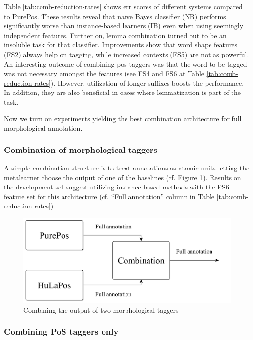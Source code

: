Table \ref{tab:comb-reduction-rates} shows \acrlong{err} scores of different systems compared to PurePos. 
These results reveal that naïve Bayes classifier (NB) performs significantly worse than instance-based learners (IB) even when using seemingly independent features.
Further on, lemma combination turned out to be an insoluble task for that classifier.
Improvements show that word shape features (FS2) always help on tagging, while increased contexts (FS5) are not as powerful.
An interesting outcome of combining \acrshort{pos} taggers was that the word to be tagged was not necessary amongst the features (see FS4 and FS6 at Table \ref{tab:comb-reduction-rates}).
However, utilization of longer suffixes boosts the performance.
In addition, they are also beneficial in cases where lemmatization is part of the task. 

Now we turn on experiments yielding the best combination architecture for full morphological annotation.

\subsubsection{Combination of morphological taggers}

A simple combination structure is to treat annotations as atomic units letting the metalearner choose the output of one of the baselines (cf. Figure \ref{fig:comb1}).
Results on the development set suggest utilizing instance-based methods with the FS6 feature set for this architecture (cf. ``Full annotation'' column in Table \ref{tab:comb-reduction-rates}). 

\begin{figure}[H]
  \centering
  \includegraphics[scale=0.2]{MorphTagging/comb1.png} 
  \caption{Combining the output of two morphological taggers}
  \label{fig:comb1}
\end{figure}

\subsubsection{Combining PoS taggers only}

